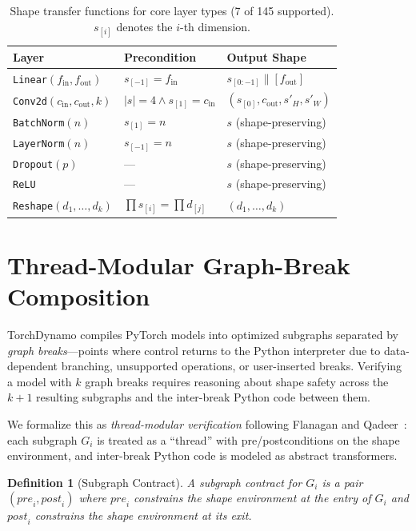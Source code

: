 \documentclass[11pt]{article}
\newtheorem{definition}[theorem]{Definition}
\begin{document}
\begin{table}[t]
\centering
\caption{Shape transfer functions for core layer types (7 of 145 supported).
  $s_{[i]}$ denotes the $i$-th dimension.}
\label{tab:shape-rules}
\small
\begin{tabular}{@{}lll@{}}
\toprule
\textbf{Layer} & \textbf{Precondition} & \textbf{Output Shape} \\
\midrule
\texttt{Linear}$(f_{\text{in}}, f_{\text{out}})$ &
  $s_{[-1]} = f_{\text{in}}$ &
  $s_{[0:-1]} \| [f_{\text{out}}]$ \\
\texttt{Conv2d}$(c_{\text{in}}, c_{\text{out}}, k)$ &
  $|s| = 4 \land s_{[1]} = c_{\text{in}}$ &
  $(s_{[0]}, c_{\text{out}}, s'_H, s'_W)$ \\
\texttt{BatchNorm}$(n)$ &
  $s_{[1]} = n$ &
  $s$ (shape-preserving) \\
\texttt{LayerNorm}$(n)$ &
  $s_{[-1]} = n$ &
  $s$ (shape-preserving) \\
\texttt{Dropout}$(p)$ &
  --- &
  $s$ (shape-preserving) \\
\texttt{ReLU} &
  --- &
  $s$ (shape-preserving) \\
\texttt{Reshape}$(d_1,\ldots,d_k)$ &
  $\prod s_{[i]} = \prod d_{[j]}$ &
  $(d_1, \ldots, d_k)$ \\
\bottomrule
\end{tabular}
\end{table}


\section{Thread-Modular Graph-Break Composition}\label{sec:thread-modular}

TorchDynamo compiles PyTorch models into optimized subgraphs separated by
\emph{graph breaks}---points where control returns to the Python
interpreter due to data-dependent branching, unsupported operations, or
user-inserted breaks.  Verifying a model with $k$ graph breaks requires
reasoning about shape safety across the $k+1$ resulting subgraphs and
the inter-break Python code between them.

We formalize this as \emph{thread-modular verification} following
Flanagan and Qadeer~\cite{flanagan03}: each subgraph $G_i$ is treated
as a ``thread'' with pre/postconditions on the shape environment, and
inter-break Python code is modeled as abstract transformers.

\begin{definition}[Subgraph Contract]\label{def:subgraph-contract}
A \emph{subgraph contract} for $G_i$ is a pair
$(\mathit{pre}_i, \mathit{post}_i)$ where
$\mathit{pre}_i$ constrains the shape environment at the entry of $G_i$
and $\mathit{post}_i$ constrains the shape environment at its exit.
\end{definition}
\end{document}
